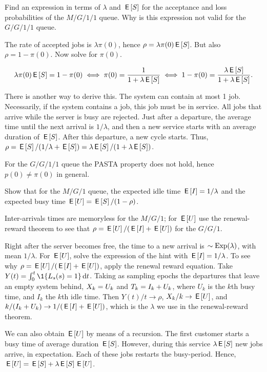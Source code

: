 \begin{exercise}
Find an expression in terms of $\lambda$ and $\,\mathsf{E}\left[S\right]$ for the acceptance and loss probabilities of  the $M/G/1/1$ queue.
Why is this expression not valid for the $G/G/1/1$ queue.
\begin{hint}
 The rate of accepted jobs is $\lambda \pi(0)$, hence $\rho= \lambda \pi(0) \,\mathsf{E}\left[S\right]$.
But also $\rho = 1-\pi(0)$.  Now solve for $\pi(0)$.
\end{hint}
\begin{solution}
 \begin{equation*}
 \lambda\pi(0) \,\mathsf{E}\left[S\right] = 1 - \pi(0) \iff \pi(0)=\frac1{1+\lambda\,\mathsf{E}\left[S\right]}
\iff 1-\pi(0) = \frac{\lambda \,\mathsf{E}\left[S\right]}{1+\lambda \,\mathsf{E}\left[S\right]}.
 \end{equation*}

 There is another way to derive this.
 The system can contain at most 1 job.
 Necessarily, if the system contains a job, this job must be in service.
 All jobs that arrive while the server is busy are rejected.
 Just after a departure, the average time until the next arrival is $1/\lambda$, and then a new service starts with an average duration of $\,\mathsf{E}\left[S\right]$.
 After this departure, a new cycle starts.
 Thus, $\rho = \,\mathsf{E}\left[S\right]/(1/\lambda + \,\mathsf{E}\left[S\right]) = \lambda \,\mathsf{E}\left[S\right]/ (1 + \lambda \,\mathsf{E}\left[S\right])$.


For the $G/G/1/1$ queue the PASTA property does not hold, hence $p(0)\neq \pi(0)$ in general.
\end{solution}
\end{exercise}


\begin{exercise}\label{ex:57}
 Show that for the $M/G/1$ queue, the expected idle time
 $\,\mathsf{E}\left[I\right] = 1/\lambda$ and the expected busy time $\,\mathsf{E}\left[U\right] = \,\mathsf{E}\left[S\right]/(1-\rho)$.
\begin{hint}
 Inter-arrivals times  are memoryless for the $M/G/1$; for $\,\mathsf{E}\left[U\right]$ use the renewal-reward theorem to see that  $\rho = \,\mathsf{E}\left[U\right]/(\,\mathsf{E}\left[I\right] + \,\mathsf{E}\left[U\right])$ for the $G/G/1$.
\end{hint}
\begin{solution}
  Right after the server becomes free, the time to a new arrival is $\sim\mathrm{Exp}(\lambda)$, with mean $1/\lambda$.
  For $\,\mathsf{E}\left[U\right]$, solve the expression of the hint with $\,\mathsf{E}\left[I\right] = 1/\lambda$.
  To see why $\rho = \,\mathsf{E}\left[U\right]/(\,\mathsf{E}\left[I\right] + \,\mathsf{E}\left[U\right])$, apply the renewal reward equation.
  Take $Y(t) = \int_0^t \1{\Ls(s)=1} \d t$.
  Taking as sampling epochs the departures that leave an empty system behind, $X_k = U_k$ and $T_k = I_k + U_k$, where $U_k$ is the $k$th busy time, and $I_k$ the $k$th idle time.
Then $Y(t)/ t\to\rho$, $X_k/k \to \,\mathsf{E}\left[U\right]$, and $k/(I_k + U_k) \to 1/(\,\mathsf{E}\left[I\right] + \,\mathsf{E}\left[U\right])$, which is the $\lambda$ we use in the renewal-reward theorem.

We can also obtain $\,\mathsf{E}\left[U\right]$ by means of a recursion. The first customer starts a busy time of average duration $\,\mathsf{E}\left[S\right]$. However, during this service $\lambda \,\mathsf{E}\left[S\right]$ new jobs arrive, in expectation. Each of these jobs restarts the busy-period. Hence, $\,\mathsf{E}\left[U\right] = \,\mathsf{E}\left[S\right] + \lambda \,\mathsf{E}\left[S\right] \,\mathsf{E}\left[U\right]$.
\end{solution}
\end{exercise}




